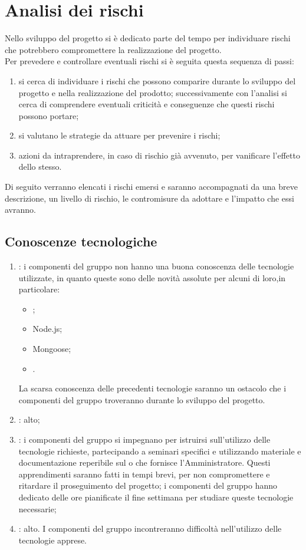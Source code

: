\section{Analisi dei rischi}
Nello sviluppo del progetto si è dedicato parte del tempo per individuare rischi che potrebbero compromettere la realizzazione del progetto.\\
Per prevedere e controllare eventuali rischi si è seguita questa sequenza di passi:
\begin{enumerate}
\item {} si cerca di individuare i rischi che possono comparire durante lo sviluppo del progetto e nella realizzazione del prodotto; successivamente con l'analisi si cerca di comprendere eventuali criticità e conseguenze che questi rischi possono portare;
\item {} si valutano le strategie da attuare  per prevenire i rischi;
\item {} azioni da intraprendere, in caso di rischio già avvenuto, per vanificare l'effetto dello stesso.
\end{enumerate}
Di seguito verranno elencati i rischi emersi e saranno accompagnati da una breve descrizione, un livello di rischio, le contromisure da adottare e l'impatto che essi avranno.

\subsection{Conoscenze tecnologiche}
\begin{enumerate}
\item {}: i componenti del gruppo non hanno una buona conoscenza delle tecnologie utilizzate, in quanto queste sono delle novità assolute per alcuni di loro,in particolare:
\begin{itemize}
\item {};
\item Node.js;
\item Mongoose;
\item {}.
\end{itemize}
La scarsa conoscenza delle precedenti tecnologie saranno un ostacolo che i componenti del gruppo troveranno durante lo sviluppo del progetto.
\item {}: alto;
\item {}: i componenti del gruppo si impegnano per istruirsi sull'utilizzo delle tecnologie richieste, partecipando a seminari specifici e utilizzando materiale e documentazione reperibile sul  o che fornisce l'Amministratore. Questi apprendimenti saranno fatti in tempi brevi, per non compromettere e ritardare il proseguimento del progetto; i componenti del gruppo hanno dedicato delle ore pianificate il fine settimana per studiare queste tecnologie necessarie;
\item {}: alto. I componenti del gruppo incontreranno difficoltà nell'utilizzo delle tecnologie apprese.
\end{enumerate}

